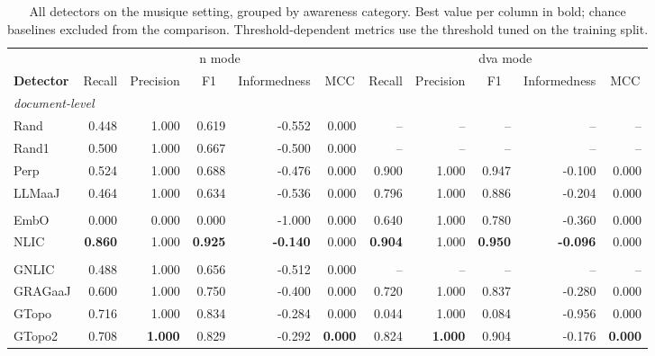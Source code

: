 \begin{table}[t]
  \centering
  \scriptsize
  \setlength{\tabcolsep}{2.5pt}
  \begin{tabular}{lrrrrrrrrrr}
    \toprule
    & \multicolumn{5}{c}{n mode} & \multicolumn{5}{c}{dva mode} \\
    \cmidrule(lr){2-6} \cmidrule(lr){7-11}
    \textbf{Detector} & \multicolumn{1}{c}{Recall} & \multicolumn{1}{c}{Precision} & \multicolumn{1}{c}{F1} & \multicolumn{1}{c}{Informedness} & \multicolumn{1}{c}{MCC} & \multicolumn{1}{c}{Recall} & \multicolumn{1}{c}{Precision} & \multicolumn{1}{c}{F1} & \multicolumn{1}{c}{Informedness} & \multicolumn{1}{c}{MCC} \\
    \midrule
    \multicolumn{11}{l}{\textit{document-level}} \\
    Rand & 0.448 & 1.000 & 0.619 & -0.552 & 0.000 & -- & -- & -- & -- & -- \\
    Rand1 & 0.500 & 1.000 & 0.667 & -0.500 & 0.000 & -- & -- & -- & -- & -- \\
    Perp & 0.524 & 1.000 & 0.688 & -0.476 & 0.000 & 0.900 & 1.000 & 0.947 & -0.100 & 0.000 \\
    LLMaaJ & 0.464 & 1.000 & 0.634 & -0.536 & 0.000 & 0.796 & 1.000 & 0.886 & -0.204 & 0.000 \\
    \addlinespace
    \multicolumn{11}{l}{\textit{embedding-aware}} \\
    EmbO & 0.000 & 0.000 & 0.000 & -1.000 & 0.000 & 0.640 & 1.000 & 0.780 & -0.360 & 0.000 \\
    NLIC & \textbf{0.860} & 1.000 & \textbf{0.925} & \textbf{-0.140} & 0.000 & \textbf{0.904} & 1.000 & \textbf{0.950} & \textbf{-0.096} & 0.000 \\
    \addlinespace
    \multicolumn{11}{l}{\textit{grag-aware}} \\
    GNLIC & 0.488 & 1.000 & 0.656 & -0.512 & 0.000 & -- & -- & -- & -- & -- \\
    GRAGaaJ & 0.600 & 1.000 & 0.750 & -0.400 & 0.000 & 0.720 & 1.000 & 0.837 & -0.280 & 0.000 \\
    GTopo & 0.716 & 1.000 & 0.834 & -0.284 & 0.000 & 0.044 & 1.000 & 0.084 & -0.956 & 0.000 \\
    GTopo2 & 0.708 & \textbf{1.000} & 0.829 & -0.292 & \textbf{0.000} & 0.824 & \textbf{1.000} & 0.904 & -0.176 & \textbf{0.000} \\
    \bottomrule
  \end{tabular}
  \caption{All detectors on the musique setting, grouped by awareness category. Best value per column in bold; chance baselines excluded from the comparison. Threshold-dependent metrics use the threshold tuned on the training split.}
  \label{tab:setting-musique}
\end{table}
